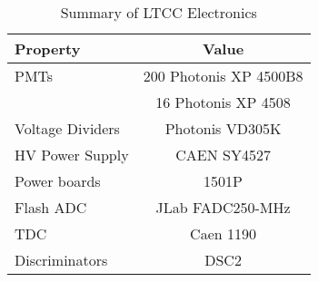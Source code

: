 \begin{table}
	\begin{center}
		\begin{tabular}{| l | c |}
			\hline \hline
			Property                 & Value \\
			\hline
			PMTs             & 200 Photonis XP 4500B8    \\
	                       & 16 Photonis XP 4508       \\
			Voltage Dividers & Photonis VD305K           \\
			HV Power Supply  & CAEN SY4527               \\
			Power boards     & 1501P                     \\
			Flash ADC        & JLab FADC250-MHz          \\
			TDC              & Caen 1190                 \\
			Discriminators   & DSC2                      \\
			\hline \hline
		\end{tabular}
	\end{center}
	\caption{Summary of LTCC Electronics}\label{tab:ltccChannels}
\end{table}

